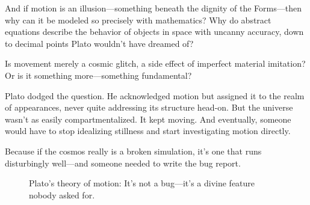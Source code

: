 And if motion is an illusion—something beneath the dignity of the Forms—then why can it be modeled so precisely with mathematics? Why do abstract equations describe the behavior of objects in space with uncanny accuracy, down to decimal points Plato wouldn’t have dreamed of?

Is movement merely a cosmic glitch, a side effect of imperfect material imitation? Or is it something more—something fundamental?

Plato dodged the question. He acknowledged motion but assigned it to the realm of appearances, never quite addressing its structure head-on. But the universe wasn’t as easily compartmentalized. It kept moving. And eventually, someone would have to stop idealizing stillness and start investigating motion directly.

Because if the cosmos really is a broken simulation, it’s one that runs disturbingly well—and someone needed to write the bug report.

\begin{figure}[H]
\centering
{}
\caption{Plato’s theory of motion: It’s not a bug—it’s a divine feature nobody asked for.}
\end{figure}

